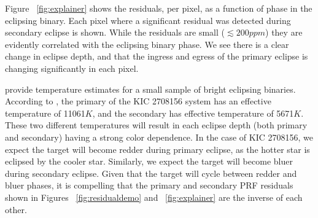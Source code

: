 \documentclass[iop]{emulateapj}
\newcommand{\target}{KIC 2708156\xspace}
\begin{document}
Figure ~\ref{fig:explainer} shows the residuals, per pixel, as a function of phase in the eclipsing binary. Each pixel where a significant residual was detected during secondary eclipse is shown. While the residuals are small ($\lesssim200ppm$) they are evidently correlated with the eclipsing binary phase. We see there is a clear change in eclipse depth, and that the ingress and egress of the primary eclipse is changing significantly in each pixel. 

\cite{ebliterature} provide temperature estimates for a small sample of bright eclipsing binaries. According to \cite{ebliterature}, the primary of the \target system has an effective temperature of 11061$K$, and the secondary has effective temperature of 5671$K$. These two different temperatures will result in each eclipse depth (both primary and secondary) having a strong color dependence. In the case of \target, we expect the target will become redder during primary eclipse, as the hotter star is eclipsed by the cooler star. Similarly, we expect the target will become bluer during secondary eclipse. Given that the target will cycle between redder and bluer phases, it is compelling that the primary and secondary PRF residuals shown in Figures ~\ref{fig:residualdemo} and ~\ref{fig:explainer} are the inverse of each other.


\end{document}
